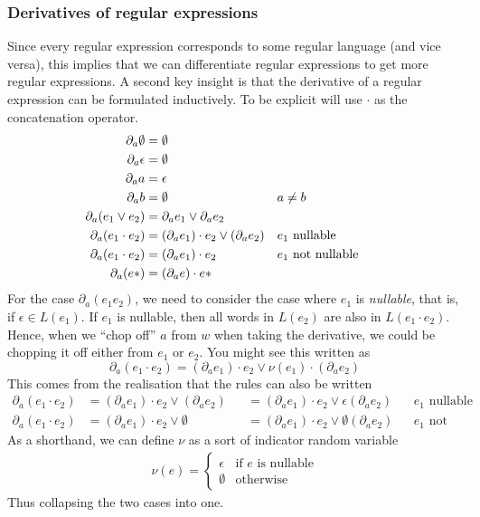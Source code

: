 \subsubsection{Derivatives of regular expressions}
Since every regular expression corresponds to some regular language (and vice versa), this implies that we can differentiate regular expressions to get more regular expressions. A second key insight is that the derivative of a regular expression can be formulated inductively. To be explicit will use $\cdot$ as the concatenation operator. 
\[\begin{aligned}
\partial_a \emptyset & = \emptyset&&\\ 
\partial_a \epsilon & = \emptyset&&\\
\partial_a a & = \epsilon&&\\
\partial_a b & = \emptyset && a \neq b&&\\
\partial_a (e_1 \lor e_2) & = \partial_a e_1 \lor \partial_a e_2&&\\
\partial_a (e_1 \cdot e_2) & = (\partial_a e_1) \cdot e_2 \lor (\partial_a e_2) && e_1 \text{ nullable}&&\\
\partial_a (e_1 \cdot e_2) & = (\partial_a e_1) \cdot e_2 && e_1 \text{ not nullable}&&\\
\partial_a (e\*) & = (\partial_a e) \cdot e\*&&
\end{aligned}\]
For the case $\partial_a (e_1 e_2)$, we need to consider the case where $e_1$ is \emph{nullable}, that is, if $\epsilon \in L(e_1)$. If $e_1$ is nullable, then all words in $L(e_2)$ are also in $L(e_1 \cdot e_2)$. Hence, when we ``chop off'' $a$ from $w$ when taking the derivative, we could be chopping it off either from $e_1$ or $e_2$. You might see this written as 
\[ \partial_a (e_1 \cdot e_2) = (\partial_a e_1) \cdot e_2 \lor \nu(e_1) \cdot (\partial_a e_2)  \]
This comes from the realisation that the rules can also be written 
\begin{align*}
\partial_a (e_1 \cdot e_2) & = (\partial_a e_1) \cdot e_2 \lor (\partial_a e_2) &&= (\partial_a e_1) \cdot e_2 \lor \epsilon(\partial_a e_2) && e_1 \text{ nullable}&&\\
\partial_a (e_1 \cdot e_2) &= (\partial_a e_1) \cdot e_2 \lor \emptyset &&= (\partial_a e_1) \cdot e_2 \lor \emptyset(\partial_a e_2) && e_1 \text{ not nullable}&&
\end{align*}
As a shorthand, we can define $\nu$ as a sort of indicator random variable
\begin{align*}
    \nu(e) = \begin{cases} 
      \epsilon & \text{if $e$ is nullable} \\
      \emptyset & \text{otherwise}
   \end{cases}
\end{align*}
Thus collapsing the two cases into one.

